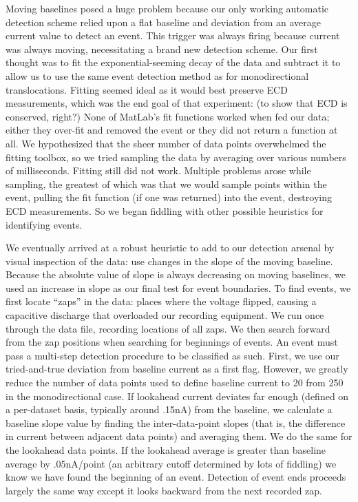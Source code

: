 \documentclass[aps,prl,preprint,groupedaddress]{revtex4}
\begin{document}
Moving baselines posed a huge problem because our only working automatic detection scheme relied upon a flat baseline and deviation from an average current value to detect an event.
This trigger was always firing because current was always moving, necessitating a brand new detection scheme.
Our first thought was to fit the exponential-seeming decay of the data and subtract it to allow us to use the same event detection method as for monodirectional translocations.
Fitting seemed ideal as it would best preserve ECD measurements, which was the end goal of that experiment: (to show that ECD is conserved, right?)
None of MatLab's fit functions worked when fed our data; either they over-fit and removed the event or they did not return a function at all.
We hypothesized that the sheer number of data points overwhelmed the fitting toolbox, so we tried sampling the data by averaging over various numbers of milliseconds.
Fitting still did not work.
Multiple problems arose while sampling, the greatest of which was that we would sample points within the event, pulling the fit function (if one was returned) into the event, destroying ECD measurements.
So we began fiddling with other possible heuristics for identifying events.

We eventually arrived at a robust heuristic to add to our detection arsenal by visual inspection of the data: use changes in the slope of the moving baseline.
Because the absolute value of slope is always decreasing on moving baselines, we used an increase in slope as our final test for event boundaries.
To find events, we first locate ``zaps'' in the data: places where the voltage flipped, causing a capacitive discharge that overloaded our recording equipment.
We run once through the data file, recording locations of all zaps.
We then search forward from the zap positions when searching for beginnings of events.
An event must pass a multi-step detection procedure to be classified as such.
First, we use our tried-and-true deviation from baseline current as a first flag.
However, we greatly reduce the number of data points used to define baseline current to 20 from 250 in the monodirectional case.
If lookahead current deviates far enough (defined on a per-dataset basis, typically around .15nA) from the baseline, we calculate a baseline slope value by finding the inter-data-point slopes (that is, the difference in current between adjacent data points) and averaging them.
We do the same for the lookahead data points.
If the lookahead average is greater than baseline average by .05nA/point (an arbitrary cutoff determined by lots of fiddling) we know we have found the beginning of an event.
Detection of event ends proceeds largely the same way except it looks backward from the next recorded zap. 
\end{document}
